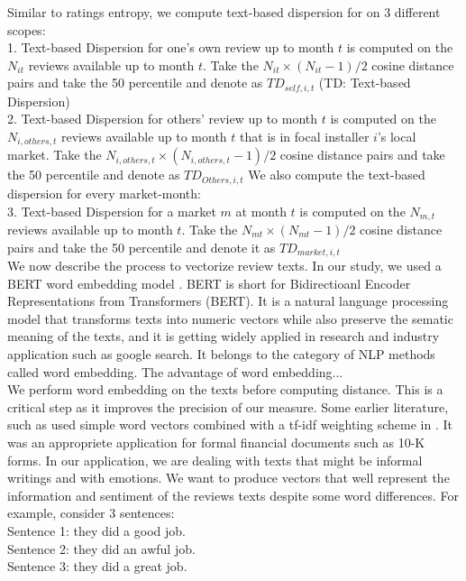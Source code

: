 \documentclass[msom,blindrev]{informs3}
\begin{document}
Similar to ratings entropy, we compute text-based dispersion for on 3 different scopes: \\
1. Text-based Dispersion for one's own review up to month $t$ is computed on the $N_{it}$ reviews available up to month $t$. Take the $N_{it}\times (N_{it}-1)/2$ cosine distance pairs and take the 50 percentile and denote as $TD_{self,i,t}$ (TD: Text-based Dispersion)\\ 
2. Text-based Dispersion for others' review up to month $t$ is computed on the $N_{i,others,t}$ reviews available up to month $t$ that is in focal installer $i$'s local market. Take the $N_{i,others,t}\times (N_{i,others,t}-1)/2$ cosine distance pairs and take the 50 percentile and denote as $TD_{Others,i,t}$ 
We also compute the text-based dispersion for every market-month: \\ 
3. Text-based Dispersion for a market $m$ at month $t$ is computed on the $N_{m,t}$ reviews available up to month $t$. Take the  $N_{mt}\times (N_{mt}-1)/2$ cosine distance pairs and take the 50 percentile and denote it as $TD_{market,i,t}$ \\ 

We now describe the process to vectorize review texts. In our study, we used a BERT word embedding model \citep{devlin2018bert}. BERT is short for Bidirectioanl Encoder Representations from Transformers (BERT). It is a natural language processing model that transforms texts into numeric vectors while also preserve the sematic meaning of the texts, and it is getting widely applied in research and industry application such as google search. It belongs to the category of NLP methods called word embedding. The advantage of word embedding... \\


We perform word embedding on the texts before computing distance. This is a critical step as it improves the precision of our measure. Some earlier literature, such as \cite{hoberg2016text} used simple word vectors combined with a tf-idf weighting scheme in \cite{loughran2011liability}. It was an appropriete application for formal financial documents such as 10-K forms. In our application, we are dealing with texts that might be informal writings and with emotions. We want to produce vectors that well represent the information and sentiment of the reviews texts despite some word differences. For example, consider 3 sentences: \\
Sentence 1: they did a good job. \\
Sentence 2: they did an awful job. \\
Sentence 3: they did a great job. \\ 
\end{document}
